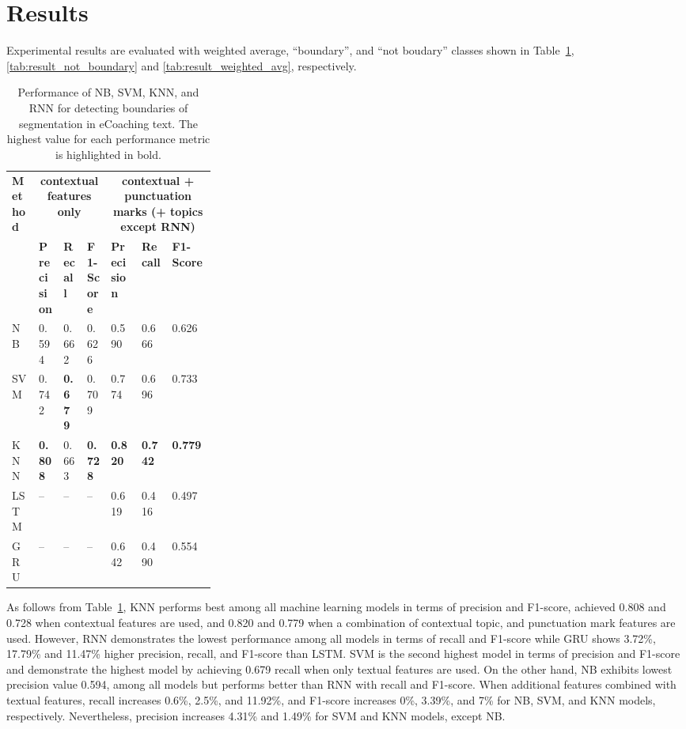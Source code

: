 \documentclass{amia}
\begin{document}
\section*{Results}
Experimental results are evaluated with weighted average, ``boundary'', and ``not boudary'' classes shown in Table~\ref{tab:result_boundary}, \ref{tab:result_not_boundary} and \ref{tab:result_weighted_avg}, respectively.\\

\begin{table}[ht]
\centering
\caption{Performance of NB, SVM, KNN, and RNN for detecting boundaries of segmentation in eCoaching text. The highest value for each performance metric is highlighted in bold.}
\label{tab:result_boundary}
  \begin{tabular}{|l|l|l|l|p{0.15\linewidth}|p{0.15\linewidth}|l|}
  \hline
   \multirow{2}{*}{\textbf{Method}} & \multicolumn{3}{|c|}{\textbf{contextual features only}} & \multicolumn{3}{|c|}{\textbf{contextual + punctuation marks (+ topics except RNN)}} \\\cline{2-7}
   & \textbf{Precision}  & \textbf{Recall} & \textbf{F1-Score} & \textbf{Precision}  & \textbf{Recall} & \textbf{F1-Score}\\ \hline    
    
 NB & 0.594 & 0.662 & 0.626 & 0.590 & 0.666 & 0.626 \\ \hline
 SVM & 0.742 & \textbf{0.679} & 0.709 & 0.774 & 0.696 & 0.733\\ \hline
 KNN & \textbf{0.808} & 0.663 & \textbf{0.728} & \textbf{0.820} & \textbf{0.742} & \textbf{0.779}\\ \hline
 LSTM & -- & -- & -- & 0.619 & 0.416 & 0.497  \\ \hline
 GRU & -- & -- & -- & 0.642 & 0.490 & 0.554 \\ \hline 
  \end{tabular}
\end{table}                 

As follows from Table~\ref{tab:result_boundary}, KNN performs best among all machine learning models in terms of precision and F1-score, achieved 0.808 and 0.728 when contextual features are used, and 0.820 and 0.779 when a combination of contextual topic, and punctuation mark features are used. However, RNN demonstrates the lowest performance among all models in terms of recall and F1-score while GRU shows 3.72\%, 17.79\% and 11.47\% higher precision, recall, and F1-score than LSTM. SVM is the second highest model in terms of precision and F1-score and demonstrate the highest model by achieving 0.679 recall when only textual features are used. On the other hand, NB exhibits lowest precision value 0.594,  among all models but performs better than RNN with recall and F1-score.
When additional features combined with textual features, recall increases 0.6\%, 2.5\%, and 11.92\%, and F1-score increases 0\%, 3.39\%, and 7\% for NB, SVM, and KNN models, respectively. Nevertheless, precision increases 4.31\% and 1.49\% for SVM and KNN models, except NB. \\
\end{document}
